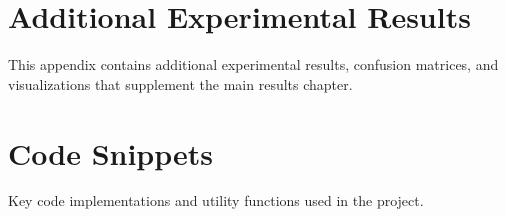 \documentclass[11pt,a4paper]{report}
\begin{document}
\chapter{Additional Experimental Results}
\label{app:additional_results}

This appendix contains additional experimental results, confusion matrices, and visualizations that supplement the main results chapter.

\chapter{Code Snippets}
\label{app:code}

Key code implementations and utility functions used in the project.
\end{document}
